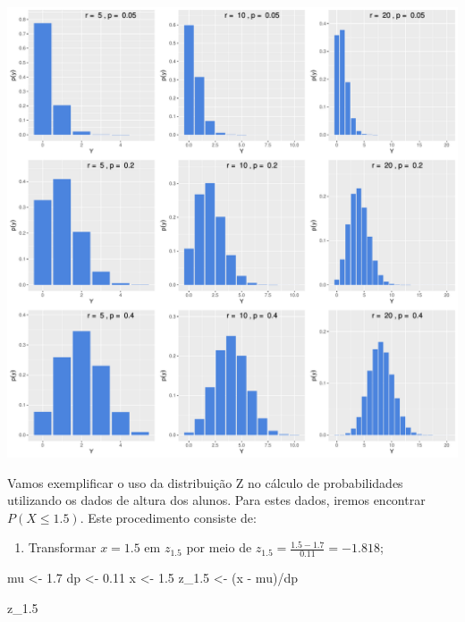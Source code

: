 \documentclass[
]{book}
\newenvironment{Shaded}{\begin{snugshade}}{\end{snugshade}}
\newcommand{\FloatTok}[1]{\textcolor[rgb]{0.00,0.00,0.81}{#1}}
\newcommand{\NormalTok}[1]{#1}
\newcommand{\OtherTok}[1]{\textcolor[rgb]{0.56,0.35,0.01}{#1}}
\newcommand{\SpecialCharTok}[1]{\textcolor[rgb]{0.00,0.00,0.00}{#1}}
\providecommand{\tightlist}{%
  \setlength{\itemsep}{0pt}\setlength{\parskip}{0pt}}
\begin{document}
\begin{center}\includegraphics{probest-cambientais_files/figure-latex/unnamed-chunk-200-1} \end{center}

Vamos exemplificar o uso da distribuição Z no cálculo de probabilidades utilizando os dados de altura dos alunos. Para estes dados, iremos encontrar \(P(X \le 1.5)\). Este procedimento consiste de:

\begin{enumerate}
\def\labelenumi{\arabic{enumi}.}
\tightlist
\item
  Transformar \(x = 1.5\) em \(z_{1.5}\) por meio de \(z_{1.5} = \frac{1.5 - 1.7}{0.11} = -1.818\);
\end{enumerate}

\begin{Shaded}
\begin{Highlighting}[]
\NormalTok{mu }\OtherTok{\textless{}{-}} \FloatTok{1.7}
\NormalTok{dp }\OtherTok{\textless{}{-}} \FloatTok{0.11}
\NormalTok{x }\OtherTok{\textless{}{-}} \FloatTok{1.5}
\NormalTok{z\_1}\FloatTok{.5} \OtherTok{\textless{}{-}}\NormalTok{ (x }\SpecialCharTok{{-}}\NormalTok{ mu)}\SpecialCharTok{/}\NormalTok{dp}

\NormalTok{z\_1}\FloatTok{.5}
\end{Highlighting}
\end{Shaded}
\end{document}
